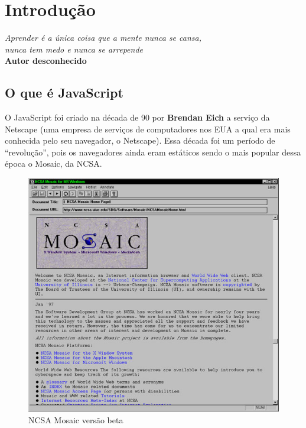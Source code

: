 \chapter{Introdução}

\begin{flushright}
  \textit{
    Aprender é a única coisa que a mente nunca se cansa, \\
    nunca tem medo e nunca se arrepende
  } \\
  
  \textbf{Autor desconhecido}
\end{flushright}

\section{O que é JavaScript}

O JavaScript foi criado na década de 90 por \textbf{Brendan Eich} a serviço da 
Netscape (uma empresa de serviços de computadores nos EUA a qual era mais 
conhecida pelo seu navegador, o Netscape). Essa década foi um período de 
``revolução'', pois os navegadores ainda eram estáticos sendo o mais popular 
dessa época o Mosaic, da NCSA.

\begin{figure}[H]
  \centering
  \includegraphics[scale=0.6]{imagens/mosaic_beta.jpg}
  \caption{NCSA Mosaic versão beta}
  \label{fig:historyComputer}
\end{figure}

